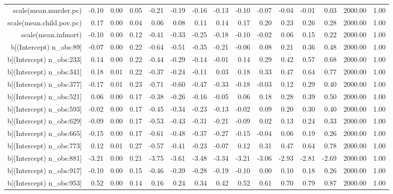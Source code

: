 \begin{table}[ht]
\begin{tabular}{rrrrrrrrrrrrrrr}
  scale(mean.murder.pc) & -0.10 & 0.00 & 0.05 & -0.21 & -0.19 & -0.16 & -0.13 & -0.10 & -0.07 & -0.04 & -0.01 & 0.03 & 2000.00 & 1.00 \\ 
  scale(mean.child.pov.pc) & 0.17 & 0.00 & 0.04 & 0.06 & 0.08 & 0.11 & 0.14 & 0.17 & 0.20 & 0.23 & 0.26 & 0.28 & 2000.00 & 1.00 \\ 
  scale(mean.infmort) & -0.10 & 0.00 & 0.12 & -0.41 & -0.33 & -0.25 & -0.18 & -0.10 & -0.02 & 0.06 & 0.15 & 0.22 & 2000.00 & 1.00 \\ 
  b[(Intercept) n\_obs:89] & -0.07 & 0.00 & 0.22 & -0.64 & -0.51 & -0.35 & -0.21 & -0.06 & 0.08 & 0.21 & 0.36 & 0.48 & 2000.00 & 1.00 \\ 
  b[(Intercept) n\_obs:233] & 0.14 & 0.00 & 0.22 & -0.44 & -0.29 & -0.14 & -0.01 & 0.14 & 0.29 & 0.42 & 0.57 & 0.68 & 2000.00 & 1.00 \\ 
  b[(Intercept) n\_obs:341] & 0.18 & 0.01 & 0.22 & -0.37 & -0.24 & -0.11 & 0.03 & 0.18 & 0.33 & 0.47 & 0.64 & 0.77 & 2000.00 & 1.00 \\ 
  b[(Intercept) n\_obs:377] & -0.17 & 0.01 & 0.23 & -0.71 & -0.60 & -0.47 & -0.33 & -0.18 & -0.03 & 0.12 & 0.29 & 0.40 & 2000.00 & 1.00 \\ 
  b[(Intercept) n\_obs:521] & 0.06 & 0.00 & 0.17 & -0.38 & -0.26 & -0.16 & -0.05 & 0.06 & 0.18 & 0.28 & 0.39 & 0.50 & 2000.00 & 1.00 \\ 
  b[(Intercept) n\_obs:593] & -0.02 & 0.00 & 0.17 & -0.45 & -0.34 & -0.23 & -0.13 & -0.02 & 0.09 & 0.20 & 0.30 & 0.40 & 2000.00 & 1.00 \\ 
  b[(Intercept) n\_obs:629] & -0.09 & 0.00 & 0.17 & -0.53 & -0.43 & -0.31 & -0.21 & -0.09 & 0.02 & 0.13 & 0.24 & 0.33 & 2000.00 & 1.00 \\ 
  b[(Intercept) n\_obs:665] & -0.15 & 0.00 & 0.17 & -0.61 & -0.48 & -0.37 & -0.27 & -0.15 & -0.04 & 0.06 & 0.19 & 0.26 & 2000.00 & 1.00 \\ 
  b[(Intercept) n\_obs:773] & 0.12 & 0.01 & 0.27 & -0.57 & -0.41 & -0.23 & -0.07 & 0.12 & 0.31 & 0.47 & 0.64 & 0.78 & 2000.00 & 1.00 \\ 
  b[(Intercept) n\_obs:881] & -3.21 & 0.00 & 0.21 & -3.75 & -3.61 & -3.48 & -3.34 & -3.21 & -3.06 & -2.93 & -2.81 & -2.69 & 2000.00 & 1.00 \\ 
  b[(Intercept) n\_obs:917] & -0.10 & 0.00 & 0.15 & -0.46 & -0.39 & -0.28 & -0.19 & -0.10 & 0.00 & 0.10 & 0.18 & 0.26 & 2000.00 & 1.00 \\ 
  b[(Intercept) n\_obs:953] & 0.52 & 0.00 & 0.14 & 0.16 & 0.24 & 0.34 & 0.42 & 0.52 & 0.61 & 0.70 & 0.79 & 0.87 & 2000.00 & 1.00 \\ 

\end{tabular}
\end{table}

